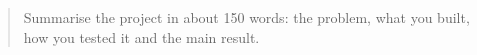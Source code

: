 \documentclass[11pt,a4paper]{article}
\begin{document}
\atlmaketitle                             %

\atlfrontmatter                           %
\begin{abstract}
Summarise the project in about 150 words: the problem, what you built, how you tested it and the
main result.
\end{abstract}
\tableofcontents

\atlmainmatter                            %








\atlappendix

\end{document}
